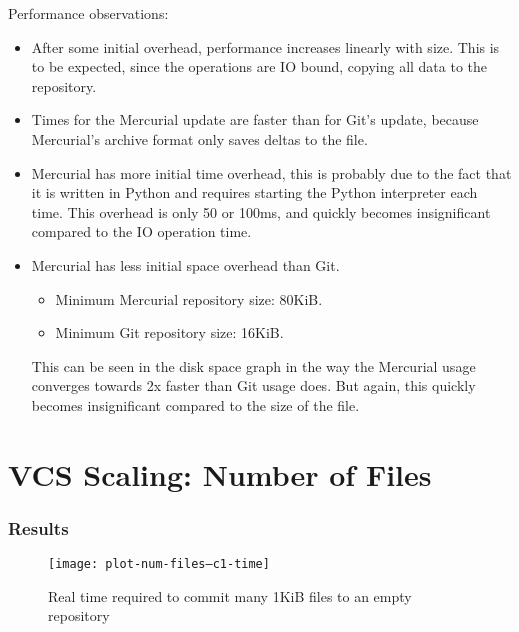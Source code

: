 Performance observations:

\begin{itemize}

    \item After some initial overhead, performance increases linearly with size.
        This is to be expected, since the operations are IO bound, copying all
        data to the repository.

    \item Times for the Mercurial update are faster than for Git's update,
        because Mercurial's archive format only saves deltas to the file.

    \item Mercurial has more initial time overhead, this is probably due to the
        fact that it is written in Python and requires starting the Python
        interpreter each time. This overhead is only 50 or 100ms, and quickly
        becomes insignificant compared to the IO operation time.

    \item Mercurial has less initial space overhead than Git.

        \begin{itemize}
            \setlength{\itemsep}{0pt}
            \setlength{\parskip}{0pt}
            \setlength{\parsep}{0pt}
            \item Minimum Mercurial repository size: 80KiB.
            \item Minimum Git repository size: 16KiB.
        \end{itemize}

        This can be seen in the disk space graph in the way the Mercurial usage
        converges towards 2x faster than Git usage does. But again, this quickly
        becomes insignificant compared to the size of the file.

\end{itemize}

\fi

\section{VCS Scaling: Number of Files}

\subsubsection{Results}

\begin{figure}[p]
  \caption{Real time required to commit many 1KiB files to an empty repository}
  \label{fig:plot-num-files--c1-time}
  \centering
    \texttt{[image: plot-num-files--c1-time]}
\end{figure}

